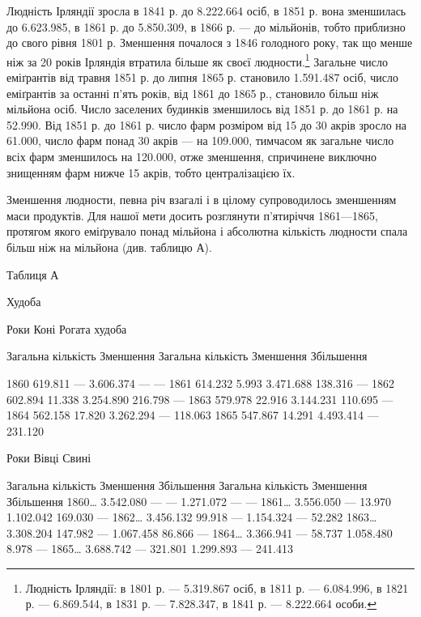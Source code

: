 Людність Ірляндії зросла в 1841 р. до 8.222.664 осіб, в 1851 р.
вона зменшилась до 6.623.985, в 1861 р. до 5.850.309, в 1866 р. —
до  мільйонів, тобто приблизно до свого рівня 1801 р. Зменшення
почалося з 1846 голодного року, так що менше ніж за
20 років Ірляндія втратила більше як  своєї людности.\footnote{
Людність Ірляндії: в 1801 р. — 5.319.867 осіб, в 1811 р. — 6.084.996,
в 1821 р. — 6.869.544, в 1831 р. — 7.828.347, в 1841 р. — 8.222.664 особи.
}
Загальне число еміґрантів від травня 1851 р. до липня 1865 р.
становило 1.591.487 осіб, число еміґрантів за останні п’ять років,
від 1861 до 1865 р., становило більш ніж  мільйона осіб. Число
заселених будинків зменшилось від 1851 р. до 1861 р. на 52.990.
Від 1851 р. до 1861 р. число фарм розміром від 15 до 30 акрів зросло
на 61.000, число фарм понад 30 акрів — на 109.000, тимчасом
як загальне число всіх фарм зменшилось на 120.000, отже зменшення,
спричинене виключно знищенням фарм нижче 15 акрів,
тобто централізацією їх.

Зменшення людности, певна річ взагалі і в цілому супроводилось
зменшенням маси продуктів. Для нашої мети досить
розглянути п’ятиріччя 1861—1865, протягом якого еміґрувало
понад  мільйона і абсолютна кількість людности спала
більш ніж на  мільйона (див. таблицю А).

Таблиця А

Худоба

Роки    Коні    Рогата худоба

    Загальна кількість    Зменшення    Загальна кількість    Зменшення    Збільшення

1860                619.811              —                    3.606.374                       —
                 —
1861                614.232           5.993                 3.471.688                 138.316
          —
1862                602.894          11.338                3.254.890                 216.798
         —
1863                579.978          22.916                3.144.231                 110.695
         —
1864                562.158          17.820                3.262.294                       —
        118.063
1865                547.867          14.291                4.493.414                       —
         231.120

Роки    Вівці            Свині

    Загальна кількість    Зменшення    Збільшення    Загальна кількість    Зменшення    Збільшення
1860\dots{}    3.542.080         —                   —              1.271.072          —
      —
1861\dots{}    3.556.050         —               13.970         1.102.042       169.030               —
1862\dots{}    3.456.132      99.918             —              1.154.324         —
52.282
1863\dots{}    3.308.204     147.982            —              1.067.458        86.866                —
1864\dots{}    3.366.941        —                58.737         1.058.480       8.978
—
1865\dots{}    3.688.742        —                321.801       1.299.893         —
241.413
